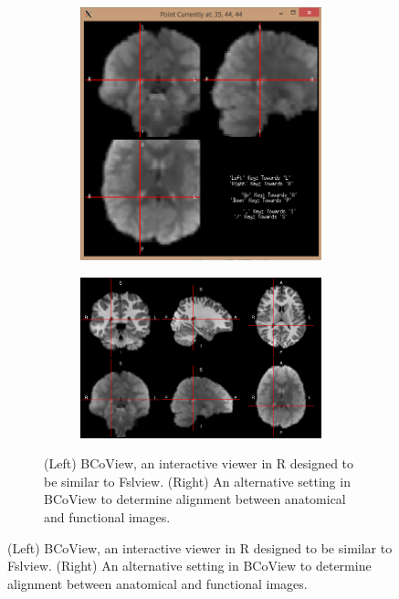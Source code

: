 \documentclass{nature}
\begin{document}
\begin{figure}[tb]
\begin{figure}
\begin{subfigure}{.5\textwidth}
\includegraphics[width=.9\linewidth]{fig/brainconductor/50002_smooth_after.png}
\end{subfigure}%
\begin{subfigure}{.5\textwidth}
  \centering
 
\includegraphics[width=.9\linewidth]{fig/brainconductor/50002_ventricles_20151225.png}
\end{subfigure}
\caption{(Left) BCoView, an interactive viewer in R designed to be similar to
Fslview. (Right) An alternative setting 
in BCoView to determine alignment between anatomical and functional images.
}
\label{fig:viewer}
\end{figure}


\end{figure}
\end{document}
